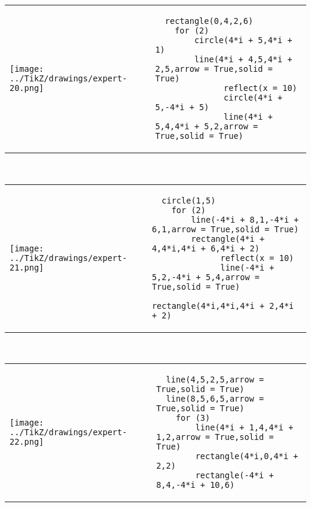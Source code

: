             \begin{tabular}{ll}
    \texttt{[image: ../TikZ/drawings/expert-20.png]}&
    
        \begin{minipage}{10cm}
        \begin{verbatim}
  rectangle(0,4,2,6)
    for (2)
        circle(4*i + 5,4*i + 1)
        line(4*i + 4,5,4*i + 2,5,arrow = True,solid = True)
              reflect(x = 10)
              circle(4*i + 5,-4*i + 5)
              line(4*i + 5,4,4*i + 5,2,arrow = True,solid = True)
        \end{verbatim}
\end{minipage}

    \end{tabular}        
            \\

            \begin{tabular}{ll}
    \texttt{[image: ../TikZ/drawings/expert-21.png]}&
    
        \begin{minipage}{10cm}
        \begin{verbatim}
  circle(1,5)
    for (2)
        line(-4*i + 8,1,-4*i + 6,1,arrow = True,solid = True)
        rectangle(4*i + 4,4*i,4*i + 6,4*i + 2)
              reflect(x = 10)
              line(-4*i + 5,2,-4*i + 5,4,arrow = True,solid = True)
              rectangle(4*i,4*i,4*i + 2,4*i + 2)
        \end{verbatim}
\end{minipage}

    \end{tabular}        
            \\

            \begin{tabular}{ll}
    \texttt{[image: ../TikZ/drawings/expert-22.png]}&
    
        \begin{minipage}{10cm}
        \begin{verbatim}
  line(4,5,2,5,arrow = True,solid = True)
  line(8,5,6,5,arrow = True,solid = True)
    for (3)
        line(4*i + 1,4,4*i + 1,2,arrow = True,solid = True)
        rectangle(4*i,0,4*i + 2,2)
        rectangle(-4*i + 8,4,-4*i + 10,6)
        \end{verbatim}
\end{minipage}

    \end{tabular}        
            \\

